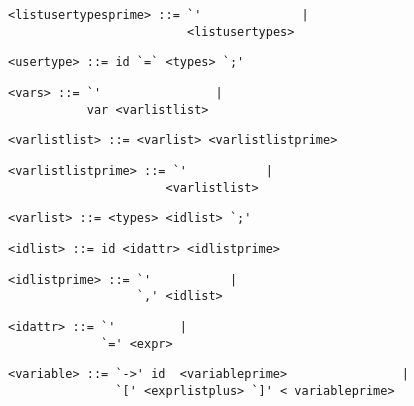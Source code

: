 \begin{footnotesize}
\begin{lstlisting}[frame=single, label={listusertypesprime}]
<listusertypesprime> ::= `'              |
                         <listusertypes>
\end{lstlisting}

\begin{lstlisting}[frame=single, label={usertypes}]
<usertype> ::= id `=` <types> `;'
\end{lstlisting}

\begin{lstlisting}[frame=single, label={vars}, language=pie]
<vars> ::= `'                |
           var <varlistlist>
\end{lstlisting}

\begin{lstlisting}[frame=single, label={varlistlist}, language=pie]
<varlistlist> ::= <varlist> <varlistlistprime>
\end{lstlisting}

\begin{lstlisting}[frame=single, label={varlistlistprime}, language=pie]
<varlistlistprime> ::= `'           |
                      <varlistlist>
\end{lstlisting}

\begin{lstlisting}[frame=single, label={varlist}, language=pie]
<varlist> ::= <types> <idlist> `;'
\end{lstlisting}

\begin{lstlisting}[frame=single, label={idlist}, language=pie]
<idlist> ::= id <idattr> <idlistprime>
\end{lstlisting}

\begin{lstlisting}[frame=single, label={idlistprime}, language=pie]
<idlistprime> ::= `'           |
                  `,' <idlist>
\end{lstlisting}

\begin{lstlisting}[frame=single, label={idattr}, language=pie]
<idattr> ::= `'         |
             `=' <expr>
\end{lstlisting}

\begin{lstlisting}[frame=single, label={variable}, language=pie]
<variable> ::= `->' id  <variableprime>                |
               `[' <exprlistplus> `]' < variableprime>
\end{lstlisting}


\end{footnotesize}
